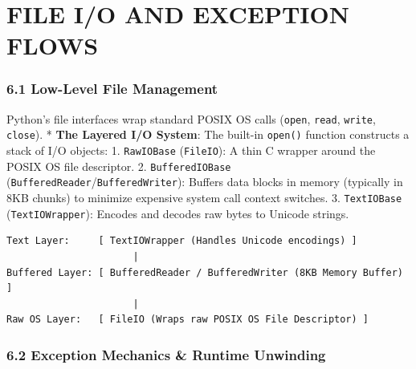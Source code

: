 \hypertarget{file-io-and-exception-flows}{%
\chapter{FILE I/O AND EXCEPTION
FLOWS}\label{file-io-and-exception-flows}}

\hypertarget{low-level-file-management}{%
\subsection{6.1 Low-Level File
Management}\label{low-level-file-management}}

Python's file interfaces wrap standard POSIX OS calls
(\passthrough{\lstinline!open!}, \passthrough{\lstinline!read!},
\passthrough{\lstinline!write!}, \passthrough{\lstinline!close!}). *
\textbf{The Layered I/O System}: The built-in
\passthrough{\lstinline!open()!} function constructs a stack of I/O
objects: 1. \passthrough{\lstinline!RawIOBase!}
(\passthrough{\lstinline!FileIO!}): A thin C wrapper around the POSIX OS
file descriptor. 2. \passthrough{\lstinline!BufferedIOBase!}
(\passthrough{\lstinline!BufferedReader!}/\passthrough{\lstinline!BufferedWriter!}):
Buffers data blocks in memory (typically in 8KB chunks) to minimize
expensive system call context switches. 3.
\passthrough{\lstinline!TextIOBase!}
(\passthrough{\lstinline!TextIOWrapper!}): Encodes and decodes raw bytes
to Unicode strings.

\begin{lstlisting}
Text Layer:     [ TextIOWrapper (Handles Unicode encodings) ]
                      |
Buffered Layer: [ BufferedReader / BufferedWriter (8KB Memory Buffer) ]
                      |
Raw OS Layer:   [ FileIO (Wraps raw POSIX OS File Descriptor) ]
\end{lstlisting}

\hypertarget{exception-mechanics-runtime-unwinding}{%
\subsection{6.2 Exception Mechanics \& Runtime
Unwinding}\label{exception-mechanics-runtime-unwinding}}

